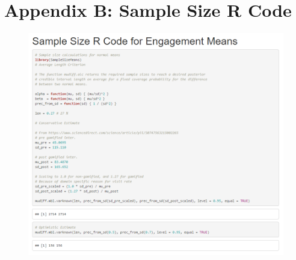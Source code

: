 \documentclass[12pt]{memoir}
\begin{document}
\clearpage
\chapter{Appendix B: Sample Size R Code}
\begin{figure}[h]
    \centering
    \includegraphics[width=\textwidth]{img/ss-01.PNG}
\end{figure}
\end{document}
